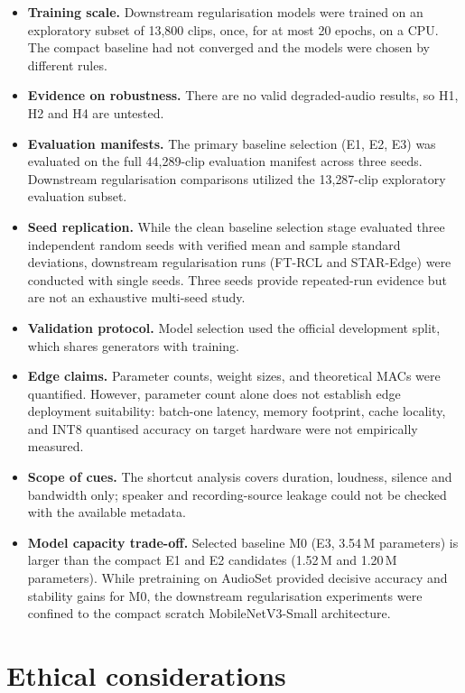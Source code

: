 \documentclass[12pt,a4paper]{report}
\begin{document}
\begin{itemize}
  \item \textbf{Training scale.} Downstream regularisation models were trained on an exploratory subset of 13{,}800 clips, once, for at most 20 epochs, on a CPU. The compact baseline had not converged and the models were chosen by different rules.
  \item \textbf{Evidence on robustness.} There are no valid degraded-audio results, so H1, H2 and H4 are untested.
  \item \textbf{Evaluation manifests.} The primary baseline selection (E1, E2, E3) was evaluated on the full 44{,}289-clip evaluation manifest across three seeds. Downstream regularisation comparisons utilized the 13{,}287-clip exploratory evaluation subset.
  \item \textbf{Seed replication.} While the clean baseline selection stage evaluated three independent random seeds with verified mean and sample standard deviations, downstream regularisation runs (FT-RCL and STAR-Edge) were conducted with single seeds. Three seeds provide repeated-run evidence but are not an exhaustive multi-seed study.
  \item \textbf{Validation protocol.} Model selection used the official development split, which shares generators with training.
  \item \textbf{Edge claims.} Parameter counts, weight sizes, and theoretical MACs were quantified. However, parameter count alone does not establish edge deployment suitability: batch-one latency, memory footprint, cache locality, and INT8 quantised accuracy on target hardware were not empirically measured.
  \item \textbf{Scope of cues.} The shortcut analysis covers duration, loudness, silence and bandwidth only; speaker and recording-source leakage could not be checked with the available metadata.
  \item \textbf{Model capacity trade-off.} Selected baseline M0 (E3, 3.54\,M parameters) is larger than the compact E1 and E2 candidates (1.52\,M and 1.20\,M parameters). While pretraining on AudioSet provided decisive accuracy and stability gains for M0, the downstream regularisation experiments were confined to the compact scratch MobileNetV3-Small architecture.
\end{itemize}

\section{Ethical considerations}
\end{document}

